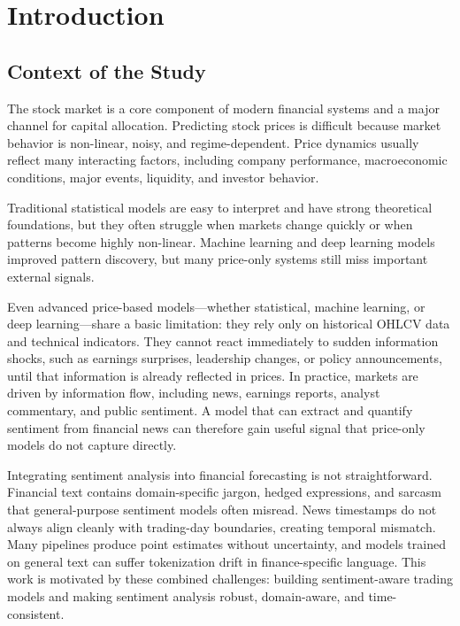 \section{Introduction}

\subsection{Context of the Study}
The stock market is a core component of modern financial systems and a major channel for capital allocation. Predicting stock prices is difficult because market behavior is non-linear, noisy, and regime-dependent. Price dynamics usually reflect many interacting factors, including company performance, macroeconomic conditions, major events, liquidity, and investor behavior.

Traditional statistical models are easy to interpret and have strong theoretical foundations, but they often struggle when markets change quickly or when patterns become highly non-linear. Machine learning and deep learning models improved pattern discovery, but many price-only systems still miss important external signals.

Even advanced price-based models---whether statistical, machine learning, or deep learning---share a basic limitation: they rely only on historical OHLCV data and technical indicators. They cannot react immediately to sudden information shocks, such as earnings surprises, leadership changes, or policy announcements, until that information is already reflected in prices. In practice, markets are driven by information flow, including news, earnings reports, analyst commentary, and public sentiment. A model that can extract and quantify sentiment from financial news can therefore gain useful signal that price-only models do not capture directly.

Integrating sentiment analysis into financial forecasting is not straightforward. Financial text contains domain-specific jargon, hedged expressions, and sarcasm that general-purpose sentiment models often misread. News timestamps do not always align cleanly with trading-day boundaries, creating temporal mismatch. Many pipelines produce point estimates without uncertainty, and models trained on general text can suffer tokenization drift in finance-specific language. This work is motivated by these combined challenges: building sentiment-aware trading models and making sentiment analysis robust, domain-aware, and time-consistent.

